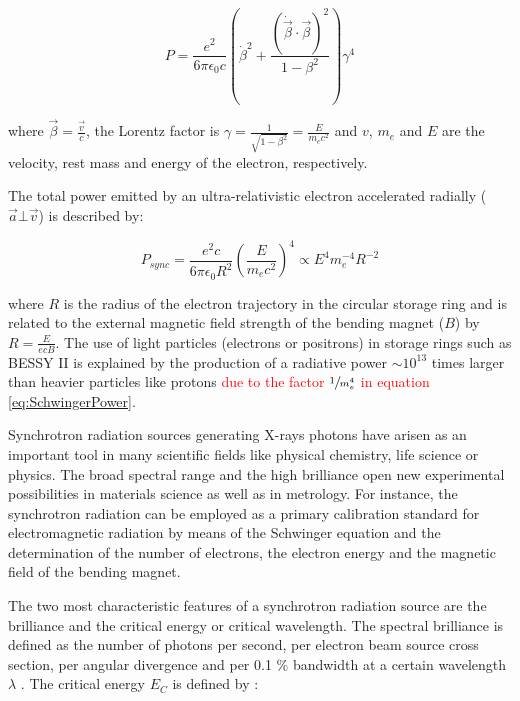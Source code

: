 \begin{equation}
        P=\frac{e^2}{6\pi\epsilon_0c}\left( \dot{\beta}^2 + \frac{(\dot{\vec{\beta}} \cdot \vec{\beta})^2}{1-\beta^2} \right) \gamma^4
\end{equation}

where $\vec{\beta}=\frac{\vec{v}}{c}$, the Lorentz factor is $\gamma=\frac{1}{\sqrt{1-\beta^2}}=\frac{E}{m_e c^2}$ and $v$, $m_e$ and $E$ are the velocity, rest mass and energy of the electron, respectively.

The total power emitted by an ultra-relativistic electron accelerated radially ($\vec{a} \bot \vec{v}$) is described by:

\begin{equation}
        \label{eq:SchwingerPower}
        P_{sync}=\frac{e^2 c}{6\pi\epsilon_0 R^2}\left(\frac{E}{m_e c^2}\right)^4 \propto E^4 m_e^{-4} R^{-2}
\end{equation}

where $R$ is the radius of the electron trajectory in the circular storage ring and is related to the external magnetic field strength of the bending magnet ($B$) by $R=\frac{E}{ecB}$. The use of light particles (electrons or positrons) in storage rings such as BESSY II is explained by the production of a radiative power $\sim 10^{13}$ times larger than heavier particles like protons \textcolor{red}{due to the factor $\sfrac{1}{m_e^4}$ in equation \ref{eq:SchwingerPower}}.

Synchrotron radiation sources generating X-rays photons have arisen as an important tool in many scientific fields like physical chemistry, life science or physics. The broad spectral range and the high brilliance open new experimental possibilities in materials science as well as in metrology. For instance, the synchrotron radiation can be employed as a primary calibration standard for electromagnetic radiation \citep{thornagel_electron_2001} by means of the Schwinger equation \citep{schwinger_classical_1949} and the determination of the number of electrons, the electron energy and the magnetic field of the bending magnet.

The two most characteristic features of a synchrotron radiation source are the brilliance and the critical energy or critical wavelength. The spectral brilliance is defined as the number of photons per second, per electron beam source cross section, per angular divergence and per 0.1 $\%$ bandwidth at a certain wavelength $\lambda$ \citep{marr_handbook_1987}. The critical energy $E_C$ is defined by \citep{schwinger_classical_1949}:

